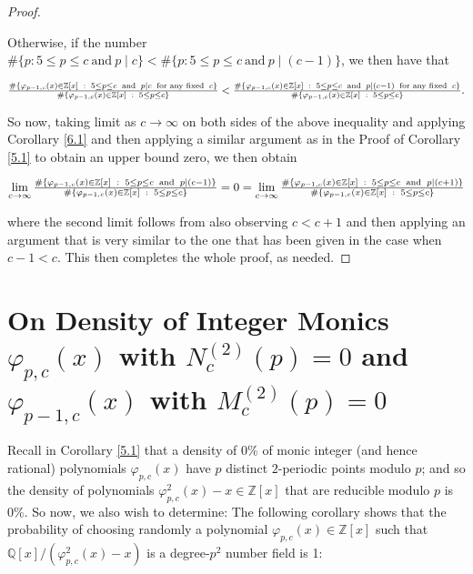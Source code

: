 \documentclass{article}
\theoremstyle{plain}
\theoremstyle{definition}
\begin{document}
\begin{proof}
\begin{center}
\end{center}Otherwise, if the number $\# \{p : 5\leq p\leq c \ \text{and} \ p\mid c \}< \# \{p : 5\leq p\leq c \ \text{and} \ p\mid (c-1) \}$, we then have that
\begin{center}
$\Large{\frac{\# \{\varphi_{p-1,c}(x) \in \mathbb{Z}[x] \ : \ 5\leq p\leq c \ \text{and} \ p\mid c \ \text{for any fixed} \ c\}}{\Large{\# \{\varphi_{p-1,c}(x) \in \mathbb{Z}[x] \ : \ 5\leq p\leq c \}}}} < \Large{\frac{\# \{\varphi_{p-1,c}(x)\in \mathbb{Z}[x] \ : \ 5\leq p\leq c \ \text{and} \ p\mid (c-1) \ \text{for any fixed} \ c \}}{\Large{\# \{\varphi_{p-1,c}(x) \in \mathbb{Z}[x] \ : \ 5\leq p\leq c \}}}}.$
\end{center}So now, taking limit as $c\to \infty$ on both sides of the above inequality and applying Corollary \ref{6.1} and then applying a similar argument as in the Proof of Corollary \ref{5.1} to obtain an upper bound zero, we then obtain
\begin{center}
$\lim\limits_{c\to\infty}\Large{\frac{\# \{\varphi_{p-1,c}(x) \in \mathbb{Z}[x] \ : \ 5\leq p\leq c \ \text{and} \ p\mid (c-1)\}}{\Large{\# \{\varphi_{p-1,c}(x) \in \mathbb{Z}[x] \ : \ 5\leq p\leq c \}}}} = 0 = \lim\limits_{c\to\infty}\Large{\frac{\# \{\varphi_{p-1,c}(x) \in \mathbb{Z}[x] \ : \ 5\leq p\leq c \ \text{and} \ p\mid (c+1)\}}{\Large{\# \{\varphi_{p-1,c}(x) \in \mathbb{Z}[x] \ : \ 5\leq p\leq c \}}}}$ 
\end{center}where the second limit follows from also observing  $c<c+1$ and then applying an argument that is very similar to the one that has been given in the case when $c-1<c$. This then completes the whole proof, as needed.
\end{proof}

\section{On Density of Integer Monics $\varphi_{p,c}(x)$ with $N_{c}^{(2)}(p) = 0$ and $\varphi_{p-1,c}(x)$ with $M_{c}^{(2)}(p) = 0$}\label{sec7}

Recall in Corollary \ref{5.1} that a density of $0\%$ of monic integer (and hence rational) polynomials $\varphi_{p,c}(x)$ have $p$ distinct $2$-periodic points modulo $p$; and so the density of polynomials $\varphi_{p,c}^2(x)-x\in \mathbb{Z}[x]$ that are reducible modulo $p$ is $0\%$. So now, we also wish to determine:  The following corollary shows that the probability of choosing randomly a polynomial $\varphi_{p,c}(x)\in \mathbb{Z}[x]$ such that $\mathbb{Q}[x]\slash (\varphi_{p, c}^2(x)-x)$ is a degree-$p^2$ number field is 1:
\end{document}
